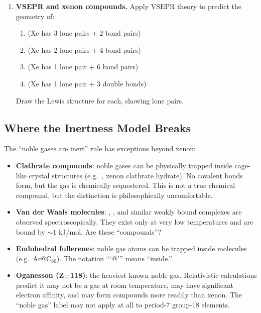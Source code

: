 \documentclass[12pt, a4paper]{book}
\begin{document}
\begin{problembox}
\begin{enumerate}[label=\textbf{\arabic*.}]
  \item \textbf{VSEPR and xenon compounds.}
        Apply VSEPR theory to predict the geometry of:
        \begin{enumerate}[label=(\alph*)]
          \item {} (Xe has 3 lone pairs + 2 bond pairs)
          \item {} (Xe has 2 lone pairs + 4 bond pairs)
          \item {} (Xe has 1 lone pair + 6 bond pairs)
          \item {} (Xe has 1 lone pair + 3 double bonds)
        \end{enumerate}
        Draw the Lewis structure for each, showing lone pairs.
\end{enumerate}
\end{problembox}

\subsection*{Where the Inertness Model Breaks}

\begin{modelbreaks}
The ``noble gases are inert'' rule has exceptions beyond xenon:

\begin{itemize}[nosep, leftmargin=2em]
  \item \textbf{Clathrate compounds}: noble gases can be physically
        trapped inside cage-like crystal structures
        (e.g.\ , xenon clathrate hydrate).
        No covalent bonds form, but the gas is chemically
        sequestered. This is not a true chemical compound,
        but the distinction is philosophically uncomfortable.
  \item \textbf{Van der Waals molecules}: ,
        , and similar weakly bound complexes
        are observed spectroscopically.
        They exist only at very low temperatures and
        are bound by $\sim 1$ kJ/mol.
        Are these ``compounds''?
  \item \textbf{Endohedral fullerenes}: noble gas atoms
        can be trapped inside  molecules
        (e.g.\ Ar@C$_{60}$).
        The notation ```@''' means ``inside.''
  \item \textbf{Oganesson (Z=118)}: the heaviest known noble gas.
        Relativistic calculations predict it may not be
        a gas at room temperature, may have significant
        electron affinity, and may form compounds more
        readily than xenon. The ``noble gas'' label
        may not apply at all to period-7 group-18 elements.
\end{itemize}
\end{modelbreaks}
\end{document}
